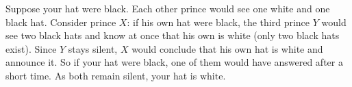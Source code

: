 Suppose your hat were black. Each other prince would see one white and one black hat. Consider prince $X$: if his own hat were black, the third prince $Y$ would see two black hats and know at once that his own is white (only two black hats exist). Since $Y$ stays silent, $X$ would conclude that his own hat is white and announce it. So if your hat were black, one of them would have answered after a short time. As both remain silent, your hat is $\boxed{\text{white}}$.

